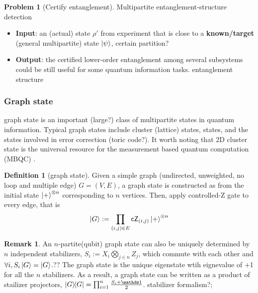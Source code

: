 \documentclass[
10pt,
aps,
pra,
linenumbers,
floatfix,
]{revtex4-2}
\theoremstyle{plain}
\theoremstyle{definition}
\newtheorem{definition}{Definition}
\newtheorem{remark}{Remark}
\newtheorem{problem}{Problem}
\newcommand{\dm}{\rho}
\begin{document}
\begin{problem}[Certify entanglement]
	Multipartite entanglement-structure detection
	\begin{itemize}
		\item \textbf{Input}: an (actual) state $\dm'$ from experiment that is close to a \textbf{known/target} (general multipartite) state $\ket{\psi}$,
		certain partition?
		\item \textbf{Output}: the certified lower-order entanglement among several subsystems could be still useful for some quantum information tasks.
		entanglement structure
	\end{itemize}
\end{problem}

\subsubsection{Graph state}
graph state is an important (large?) class of multipartite states in quantum information.
Typical graph states include cluster (lattice) states,  states, and the states involved in error correction (toric code?).
It worth noting that 2D cluster state is the universal resource for the measurement based quantum computation (MBQC) \cite{briegelMeasurementbasedQuantumComputation2009}.
\begin{definition}[graph state]\label{def:graph_state}
	Given a simple graph (undirected, unweighted, no loop and multiple edge) $G=(V,E)$, a graph state is constructed as 
	from the initial state $\ket{+}^{\otimes n}$ corresponding to $n$ vertices.
	Then, apply controlled-Z gate to every edge, that is 
	\begin{equation}
		\ket{G}:=\prod_{(i,j)\in E}\textsf{cZ}_{(i,j)} \ket{+}^{\otimes n}
	\end{equation}
\end{definition}
\begin{remark}
	An $n$-partite(qubit) graph state can also be uniquely determined by $n$ independent stabilizers, 
	$S_i:= X_i \bigotimes_{j\in n}Z_j$, 
	which commute with each other and $\forall i,S_i\ket{G}=\ket{G}$.??
	The graph state is the unique eigenstate wtih eignevalue of +1 for all the $n$ stabilizers.
	As a result, a graph state can be written as a product of stailizer projectors, $\op{G}=\prod_{i=1}^n \frac{S_i +\identity}{2}$.
	stabilizer formalism?; 
\end{remark}
\end{document}
